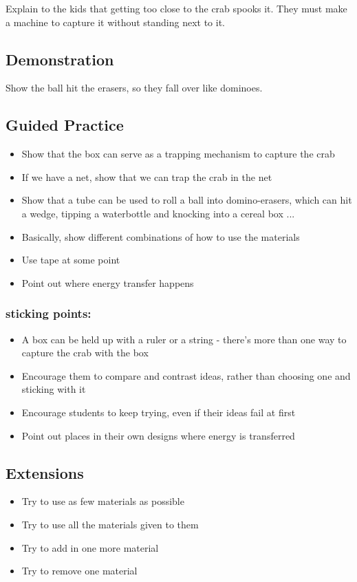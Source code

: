 \documentclass{lessonplan}
\begin{document}
      Explain to the kids that getting too close to the crab spooks it.
      They must make a machine to capture it without standing next to it.

    \subsection{Demonstration}
      Show the ball hit the erasers, so they fall over like dominoes.

    \subsection{Guided Practice}
		\begin{itemize}
			\item Show that the box can serve as a trapping mechanism to capture the crab
			\item If we have a net, show that we can trap the crab in the net
			\item Show that a tube can be used to roll a ball into domino-erasers, which can hit a wedge, tipping 
					a waterbottle and knocking into a cereal box ...
			\item Basically, show different combinations of how to use the materials
			\item Use tape at some point
			\item Point out where energy transfer happens
		\end{itemize}

      \subsubsection{sticking points:}
      \begin{itemize}
        \item A box can be held up with a ruler or a string - there's more than one way to capture the crab with the box
	    \item Encourage them to compare and contrast ideas, rather than choosing one and sticking with it
		\item Encourage students to keep trying, even if their ideas fail at first
		\item Point out places in their own designs where energy is transferred
      \end{itemize}
    \subsection{Extensions}
      \begin{itemize}
        \item Try to use as few materials as possible
		\item Try to use all the materials given to them
		\item Try to add in one more material
		\item Try to remove one material
      \end{itemize}
\end{document}
